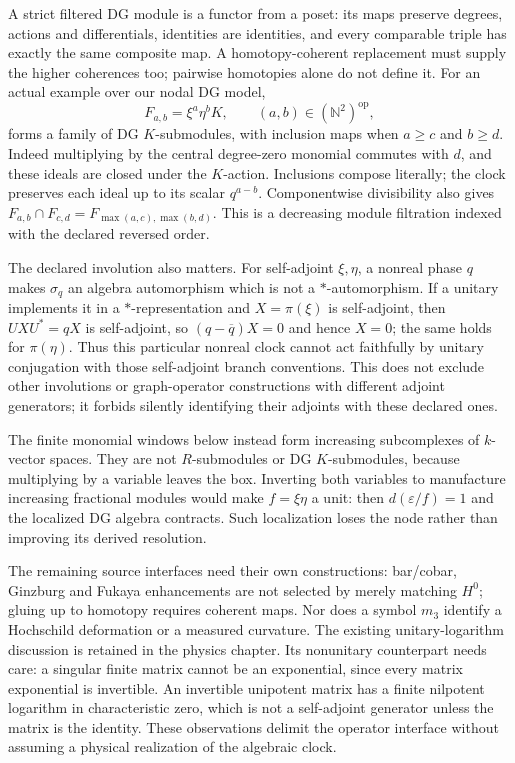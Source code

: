 \documentclass[11pt,oneside,openany]{book}
\theoremstyle{definition}\newtheorem{definition}[theorem]{Definition}
\theoremstyle{remark}\newtheorem{remark}[theorem]{Remark}
\begin{document}
A strict filtered DG module is a functor from a poset: its maps preserve
degrees, actions and differentials, identities are identities, and every
comparable triple has exactly the same composite map. A homotopy-coherent
replacement must supply the higher coherences too; pairwise homotopies
alone do not define it. For an actual example over our nodal DG model,
\[
 F_{a,b}=\xi^a\eta^b K,\qquad (a,b)\in(\mathbb N^2)^{\mathrm{op}},
\]
forms a family of DG $K$-submodules, with inclusion maps when
$a\ge c$ and $b\ge d$. Indeed multiplying by the central degree-zero
monomial commutes with $d$, and these ideals are closed under the $K$-action.
Inclusions compose literally; the clock preserves each ideal up to its
scalar $q^{a-b}$. Componentwise divisibility also gives
$F_{a,b}\cap F_{c,d}=F_{\max(a,c),\max(b,d)}$. This is a decreasing
module filtration indexed with the declared reversed order.

The declared involution also matters. For self-adjoint $\xi,\eta$, a
nonreal phase $q$ makes $\sigma_q$ an algebra automorphism which is not a
$*$-automorphism. If a unitary implements it in a $*$-representation and
$X=\pi(\xi)$ is self-adjoint, then $UXU^*=qX$ is self-adjoint, so
$(q-\overline q)X=0$ and hence $X=0$; the same holds for $\pi(\eta)$.
Thus this particular nonreal clock cannot act faithfully by unitary
conjugation with those self-adjoint branch conventions. This does not
exclude other involutions or graph-operator constructions with different
adjoint generators; it forbids silently identifying their adjoints with
these declared ones.

The finite monomial windows below instead form increasing subcomplexes of
$k$-vector spaces. They are not $R$-submodules or DG $K$-submodules, because
multiplying by a variable leaves the box. Inverting both variables to
manufacture increasing fractional modules would make $f=\xi\eta$ a unit:
then $d(\varepsilon/f)=1$ and the localized DG algebra contracts. Such
localization loses the node rather than improving its derived resolution.

The remaining source interfaces need their own constructions: bar/cobar,
Ginzburg and Fukaya enhancements are not selected by merely matching $H^0$;
gluing up to homotopy requires coherent maps. Nor does a symbol $m_3$
identify a Hochschild deformation or a measured curvature. The existing
unitary-logarithm discussion is retained in the physics chapter. Its
nonunitary counterpart needs care: a singular finite matrix cannot be an
exponential, since every matrix exponential is invertible. An invertible
unipotent matrix has a finite nilpotent logarithm in characteristic zero,
which is not a self-adjoint generator unless the matrix is the identity.
These observations delimit the operator interface without assuming a
physical realization of the algebraic clock.
\end{document}
